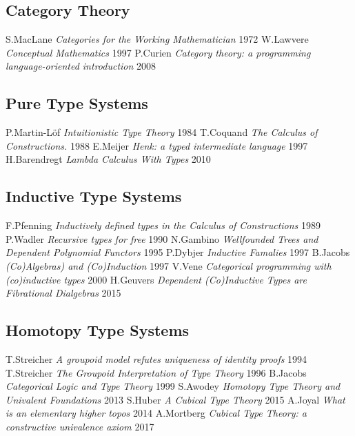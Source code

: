 \documentclass[11pt,oneside]{article}
\begin{document}
\newpage
\begin{thebibliography}{9}

\subsection*{Category Theory}
    S.MacLane \textit{Categories for the Working Mathematician} 1972
    W.Lawvere \textit{Conceptual Mathematics} 1997
     P.Curien \textit{Category theory: a programming language-oriented introduction} 2008

\subsection*{Pure Type Systems}
  P.Martin-Löf \textit{Intuitionistic Type Theory} 1984
    T.Coquand \textit{The Calculus of Constructions.} 1988
       E.Meijer \textit{Henk: a typed intermediate language} 1997
 H.Barendregt \textit{Lambda Calculus With Types} 2010

\subsection*{Inductive Type Systems}
   F.Pfenning \textit{Inductively defined types in the Calculus of Constructions} 1989
     P.Wadler \textit{Recursive types for free} 1990
    N.Gambino \textit{Wellfounded Trees and Dependent Polynomial Functors} 1995
     P.Dybjer \textit{Inductive Famalies} 1997
     B.Jacobs \textit{(Co)Algebras) and (Co)Induction} 1997
       V.Vene \textit{Categorical programming with (co)inductive types} 2000
    H.Geuvers \textit{Dependent (Co)Inductive Types are Fibrational Dialgebras} 2015


\subsection*{Homotopy Type Systems}
 T.Streicher \textit{A groupoid model refutes uniqueness of identity proofs} 1994
  T.Streicher \textit{The Groupoid Interpretation of Type Theory} 1996
    B.Jacobs \textit{Categorical Logic and Type Theory} 1999
     S.Awodey \textit{Homotopy Type Theory and Univalent Foundations} 2013
      S.Huber \textit{A Cubical Type Theory} 2015
      A.Joyal \textit{What is an elementary higher topos} 2014
   A.Mortberg \textit{Cubical Type Theory: a constructive univalence axiom} 2017

\end{thebibliography}
\end{document}
